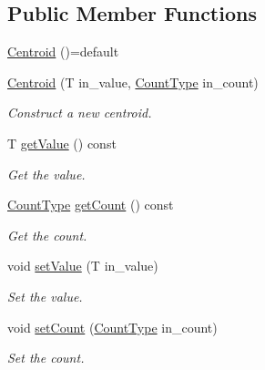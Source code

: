 \subsection*{Public Member Functions}
\begin{DoxyCompactItemize}
\item 
\hyperlink{structvt_1_1util_1_1adt_1_1detail_1_1_centroid_a566041829c6432cb574dec14a7686141}{Centroid} ()=default
\item 
\hyperlink{structvt_1_1util_1_1adt_1_1detail_1_1_centroid_a7950a3f8199b064108e117106014b645}{Centroid} (T in\+\_\+value, \hyperlink{structvt_1_1util_1_1adt_1_1detail_1_1_centroid_ac3815361e4f13eeb8b2863d2eb8db1dd}{Count\+Type} in\+\_\+count)
\begin{DoxyCompactList}\small\item\em Construct a new centroid. \end{DoxyCompactList}\item 
T \hyperlink{structvt_1_1util_1_1adt_1_1detail_1_1_centroid_a16f468b91d64cd35579e5ca7785b7ff4}{get\+Value} () const
\begin{DoxyCompactList}\small\item\em Get the value. \end{DoxyCompactList}\item 
\hyperlink{structvt_1_1util_1_1adt_1_1detail_1_1_centroid_ac3815361e4f13eeb8b2863d2eb8db1dd}{Count\+Type} \hyperlink{structvt_1_1util_1_1adt_1_1detail_1_1_centroid_ac8a85e340729654a913668059d34a278}{get\+Count} () const
\begin{DoxyCompactList}\small\item\em Get the count. \end{DoxyCompactList}\item 
void \hyperlink{structvt_1_1util_1_1adt_1_1detail_1_1_centroid_a3d847e231f7e152242a78be89b41e55b}{set\+Value} (T in\+\_\+value)
\begin{DoxyCompactList}\small\item\em Set the value. \end{DoxyCompactList}\item 
void \hyperlink{structvt_1_1util_1_1adt_1_1detail_1_1_centroid_a7abe96415d943f38db8381a7be593fde}{set\+Count} (\hyperlink{structvt_1_1util_1_1adt_1_1detail_1_1_centroid_ac3815361e4f13eeb8b2863d2eb8db1dd}{Count\+Type} in\+\_\+count)
\begin{DoxyCompactList}\small\item\em Set the count. \end{DoxyCompactList}\item 

\end{DoxyCompactItemize}
